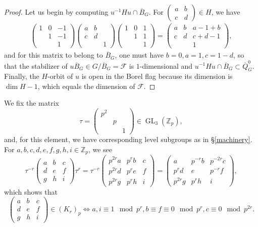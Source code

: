 \documentclass[12pt,a4paper,reqno]{amsart}
\theoremstyle{definition}
\numberwithin{definition}{subsection}
\theoremstyle{definition}
\numberwithin{Definition}{subsection}
\theoremstyle{remark}
\theoremstyle{remark}
\numberwithin{Remark}{subsection}
\theoremstyle{remark}
\theoremstyle{plain}
\numberwithin{Theorem}{subsection}
\theoremstyle{plain}
\theoremstyle{plain}
\theoremstyle{plain}
\theoremstyle{plain}
\theoremstyle{plain}
\theoremstyle{plain}
\theoremstyle{plain}
\newcommand*{\Z}{\mathbb{Z}}
\DeclareMathOperator{\GL}{GL}
\begin{document}
\begin{proof}
Let us begin by computing $u^{-1}Hu\cap \overline{B}_G$. For $\begin{pmatrix}
a&b\\
c&d
\end{pmatrix}\in H$, we have
\begin{align*}
\begin{pmatrix}
1&0&-1\\
&1&-1\\
&&1
\end{pmatrix} \begin{pmatrix}
a&b&\\
c&d&\\
&&1
\end{pmatrix} \begin{pmatrix}
1&0&1\\
&1&1\\
&&1
\end{pmatrix}=\begin{pmatrix}
a&b&a-1+b\\c&d&c+d-1\\
&&1
\end{pmatrix},
\end{align*}
and for this matrix to belong to $\overline{B}_G$, one must have $b=0, a=1, c=1-d$, so that the stabilizer of $u\overline{B}_G\in G/\overline{B}_G=\mathcal{F}$ is $1$-dimensional and $u^{-1}Hu\cap \overline{B}_G\subset \overline{Q}^0_G$.
Finally, the $H$-orbit of $u$ is open in the Borel flag because its dimension is $\dim H-1$, which equals the dimension of $\mathcal{F}$.

\end{proof}

We fix the matrix $$\tau=\begin{pmatrix}
p^2&&\\
&p&\\
&&1
\end{pmatrix}\in \GL_3(\Z_p),$$
and, for this element, we have corresponding level subgroups as in \S \ref{machinery}. For $a,b,c,d,e,f,g,h,i\in \Z_p$, we see
\[
\tau^{-r}\begin{pmatrix}
a&b&c\\
d&e&f\\
g&h&i
\end{pmatrix}\tau^{r}=\tau^{-r}\begin{pmatrix}
p^{2r}a&p^{r}b&c\\
p^{2r}d&p^{r}e&f\\
p^{2r}g&p^{r}h&i
\end{pmatrix}=\begin{pmatrix}
a&p^{-r}b&p^{-2r}c\\
p^{r}d&e&p^{-r}f\\
p^{2r}g&p^{r}h&i
\end{pmatrix},
\]
which shows that 
\[
\begin{pmatrix}
a&b&c\\
d&e&f\\
g&h&i
\end{pmatrix}\in (K_r)_p\Leftrightarrow a,i\equiv 1\!\!\mod p^r,b\equiv f\equiv 0\!\!\mod p^r, c\equiv 0\!\!\mod p^{2r}.
\]
\end{document}

